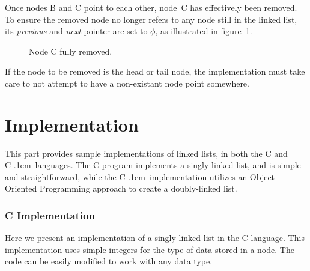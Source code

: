 \documentclass{article}
\newcommand{\Cpp}{\mbox{C\kern-.1em\raisebox{.35ex}{\smaller{\smaller{+\kern-0.05em+}}}}}
\begin{document}
  Once nodes B and C point to each other, node~C has effectively been removed. To ensure the removed node no longer refers to any node still in the linked list, its \emph{previous} and \emph{next} pointer are set to $\phi$, as illustrated in figure~\ref{fig:doublelinkedlist-after-remove}.
  \begin{figure}[H]
    \centering
    \caption{Node C fully removed.}
    \label{fig:doublelinkedlist-after-remove}
  \end{figure}

  If the node to be removed is the head or tail node, the implementation must take care to not attempt to have a non-existant node point somewhere.

  \part{Implementation}\label{part:implementation}
  This part provides sample implementations of linked lists, in both the C and \Cpp\ languages. The C program implements a singly-linked list, and is simple and straightforward, while the \Cpp\ implementation utilizes an Object Oriented Programming approach to create a doubly-linked list.
  \section{C Implementation}
  \label{sect:C_implementation}
  Here we present an implementation of a singly-linked list in the C language. This implementation uses simple integers for the type of data stored in a node. The code can be easily modified to work with any data type.
\end{document}
